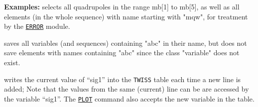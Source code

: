 \vskip 5mm
\textbf{Examples:} 
selects all quadrupoles in the range mb[1] to mb[5], as well as all
elements (in the whole sequence) with name starting with "mqw", for 
treatment by the \hyperref[chap:error]{\texttt{ERROR}} module.  

\vskip 5mm
saves all variables (and sequences) containing "abc" in their name, 
but does not save elements with names containing "abc" since the class
"variable" does not exist.  

\vskip 5mm
writes the current value of ``sig1'' into the \texttt{TWISS} table each
time a new line is added; Note that the values from the same (current)
line can be are accessed by the variable ``sig1''.
The \hyperref[chap:plot]{\texttt{PLOT}} command also accepts the new variable 
in the table.  



